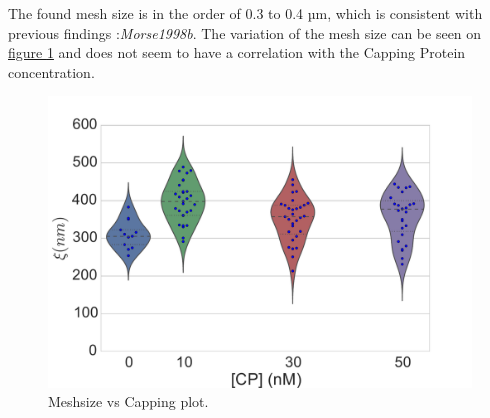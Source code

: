 \documentclass[A4paperpaper,11pt,english]{sphinxmanual}
\begin{document}
The found mesh size is in the order of 0.3 to 0.4 µm, which is consistent with previous findings
:\emph{Morse1998b}. The variation of the
mesh size can be seen on \hyperref[parts/part3:xi-violin]{figure  \ref*{parts/part3:xi-violin}} and does not seem to have a
correlation with the Capping Protein concentration.
\begin{figure}[htbp]
\centering
\capstart

\includegraphics[width=0.800\linewidth]{xi_violin.pdf}
\caption{Meshsize vs Capping plot.}\label{parts/part3:xi-violin}\end{figure}
\end{document}
